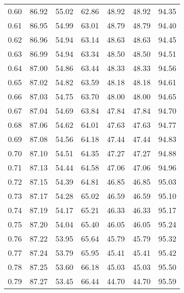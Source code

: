 \begin{tabular}{|c|c|c|c|c|c|c|}
      0.60 &     86.92 &     55.02 &      62.86 &   48.92 &      48.92 &         94.35 \\
      0.61 &     86.95 &     54.99 &      63.01 &   48.79 &      48.79 &         94.40 \\
      0.62 &     86.96 &     54.94 &      63.14 &   48.63 &      48.63 &         94.45 \\
      0.63 &     86.99 &     54.94 &      63.34 &   48.50 &      48.50 &         94.51 \\
      0.64 &     87.00 &     54.86 &      63.44 &   48.33 &      48.33 &         94.56 \\
      0.65 &     87.02 &     54.82 &      63.59 &   48.18 &      48.18 &         94.61 \\
      0.66 &     87.03 &     54.75 &      63.70 &   48.00 &      48.00 &         94.65 \\
      0.67 &     87.04 &     54.69 &      63.84 &   47.84 &      47.84 &         94.70 \\
      0.68 &     87.06 &     54.62 &      64.01 &   47.63 &      47.63 &         94.77 \\
      0.69 &     87.08 &     54.56 &      64.18 &   47.44 &      47.44 &         94.83 \\
      0.70 &     87.10 &     54.51 &      64.35 &   47.27 &      47.27 &         94.88 \\
      0.71 &     87.13 &     54.44 &      64.58 &   47.06 &      47.06 &         94.96 \\
      0.72 &     87.15 &     54.39 &      64.81 &   46.85 &      46.85 &         95.03 \\
      0.73 &     87.17 &     54.28 &      65.02 &   46.59 &      46.59 &         95.10 \\
      0.74 &     87.19 &     54.17 &      65.21 &   46.33 &      46.33 &         95.17 \\
      0.75 &     87.20 &     54.04 &      65.40 &   46.05 &      46.05 &         95.24 \\
      0.76 &     87.22 &     53.95 &      65.64 &   45.79 &      45.79 &         95.32 \\
      0.77 &     87.24 &     53.79 &      65.95 &   45.41 &      45.41 &         95.42 \\
      0.78 &     87.25 &     53.60 &      66.18 &   45.03 &      45.03 &         95.50 \\
      0.79 &     87.27 &     53.45 &      66.44 &   44.70 &      44.70 &         95.59 \\

\end{tabular}
